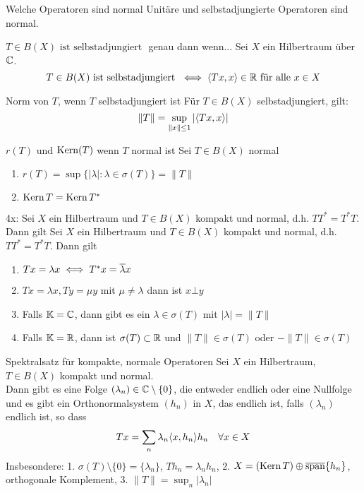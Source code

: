 \begin{karte}{Welche Operatoren sind normal}
	Unitäre und selbstadjungierte Operatoren sind normal.	
\end{karte}

\begin{karte}{$T \in B(X) \text{ ist selbstadjungiert }$ genau dann wenn...}
	Sei $X$ ein Hilbertraum über $\mathbb{C}$. \\
		\[ T \in B(X) \text{ ist selbstadjungiert } \iff \langle T x , x \rangle \in \mathbb{R} \text{ für alle } x \in X \]
\end{karte}

\begin{karte}{Norm von $T$, wenn $T$ selbstadjungiert ist}
	Für $T \in B(X)$ selbstadjungiert, gilt:
	\[ \| T \| = \sup_{\| x \| \leq 1} |\langle T x , x \rangle| \]	
\end{karte}

\begin{karte}{$r(T)$ und $\mathop{\rm Kern}\nolimits(T)$ wenn $T$ normal ist}
	Sei $T \in B(X)$ normal
	\begin{enumerate}[label=\alph*\upshape)]
		\item $r(T) = \sup \{ | \lambda | : \lambda \in \sigma(T) \} = \| T \|$
		\item $\mathop{\rm Kern}\nolimits T = \mathop{\rm Kern}\nolimits T^{*}$
	\end{enumerate}	
\end{karte}

\begin{karte}{4x: Sei $X$ ein Hilbertraum und $T \in B(X)$ kompakt und normal, d.h.  $T T^{*} = T^{*} T$. Dann gilt}
	Sei $X$ ein Hilbertraum und $T \in B(X)$ kompakt und normal, d.h.  $T T^{*} = T^{*} T$. Dann gilt
	\begin{enumerate}[label=\alph*\upshape)]
		\item $T x = \lambda x \iff T^{*} x = \overline{\lambda} x$
		\item $T x = \lambda x, T y = \mu y$ mit $\mu \neq \lambda$  dann ist $x \bot y$
		\item Falls $\mathbb{K} = \mathbb{C}$, dann gibt es ein $\lambda \in \sigma(T)$ mit $| \lambda | = \| T \|$
		\item Falls $\mathbb{K} = \mathbb{R}$, dann ist $\sigma(T) \subset \mathbb{R}$ und $\| T \| \in \sigma(T)$ oder $- \| T \| \in \sigma(T)$
	\end{enumerate}
\end{karte}

\begin{karte}{Spektralsatz für kompakte, normale Operatoren}
	Sei $X$ ein Hilbertraum, $T \in B(X)$ kompakt und normal. \\
	Dann gibt es eine Folge $(\lambda_{n}) \in \mathbb{C} \setminus \{ 0 \}$, die entweder endlich oder eine Nullfolge und es gibt ein Orthonormalsystem $(h_{n})$ in $X$, das endlich ist, falls $(\lambda_{n})$ endlich ist, so dass
	\[ Tx = \sum_{n} \lambda_{n} \langle x , h_{n} \rangle h_{n} \quad \forall x \in X \]
	Insbesondere: 1. $\sigma(T) \setminus \{ 0 \} = \{ \lambda_{n} \}$, $T h_{n} = \lambda_{n} h_{n}$, 2. $X = \left( \mathop{\rm Kern}\nolimits T \right) \oplus \overline{\operatorname{span}} \{ h_{n} \}$, orthogonale Komplement, 3. $\| T \| = \sup_{n} | \lambda_{n} |$ 
\end{karte}

